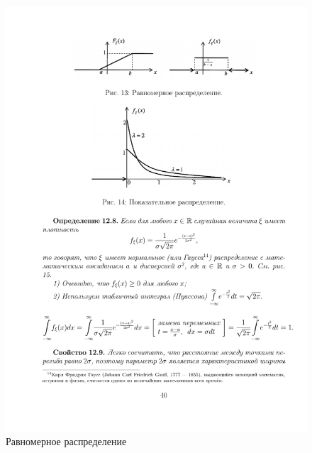 \begin{figure}[h!]
	\centering
	\includegraphics[]{pic/pic13}
	\caption{Равномерное распределение}
	\label{fig13}
\end{figure}
